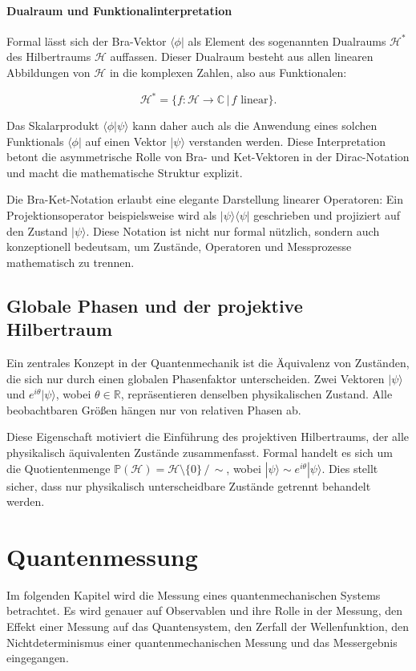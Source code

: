 \paragraph{Dualraum und Funktionalinterpretation}

Formal lässt sich der Bra-Vektor $\langle \phi|$ als Element des sogenannten Dualraums $\mathcal{H}^*$ des Hilbertraums $\mathcal{H}$ auffassen. Dieser Dualraum besteht aus allen linearen Abbildungen von $\mathcal{H}$ in die komplexen Zahlen, also aus Funktionalen:

\[
\mathcal{H}^* = \{ f : \mathcal{H} \to \mathbb{C} \,|\, f \text{ linear} \}.
\]

Das Skalarprodukt $\langle \phi | \psi \rangle$ kann daher auch als die Anwendung eines solchen Funktionals $\langle \phi|$ auf einen Vektor $|\psi\rangle$ verstanden werden. Diese Interpretation betont die asymmetrische Rolle von Bra- und Ket-Vektoren in der Dirac-Notation und macht die mathematische Struktur explizit.

Die Bra-Ket-Notation erlaubt eine elegante Darstellung linearer Operatoren: Ein Projektionsoperator beispielsweise wird als $|\psi\rangle\langle\psi|$ geschrieben und projiziert auf den Zustand $|\psi\rangle$. Diese Notation ist nicht nur formal nützlich, sondern auch konzeptionell bedeutsam, um Zustände, Operatoren und Messprozesse mathematisch zu trennen.

\subsection{Globale Phasen und der projektive Hilbertraum}
\label{subsec:Globale Phasen und der projektive Hilbertraum }

Ein zentrales Konzept in der Quantenmechanik ist die Äquivalenz von Zuständen, die sich nur durch einen globalen Phasenfaktor unterscheiden. Zwei Vektoren $|\psi\rangle$ und $e^{i\theta} |\psi\rangle$, wobei $\theta \in \mathbb{R}$, repräsentieren denselben physikalischen Zustand. Alle beobachtbaren Größen hängen nur von relativen Phasen ab.

Diese Eigenschaft motiviert die Einführung des projektiven Hilbertraums, der alle physikalisch äquivalenten Zustände zusammenfasst. Formal handelt es sich um die Quotientenmenge $\mathbb{P}(\mathcal{H}) = \mathcal{H} \setminus \{0\} \,/\, \sim$, wobei $|\psi\rangle \sim e^{i\theta}|\psi\rangle$. Dies stellt sicher, dass nur physikalisch unterscheidbare Zustände getrennt behandelt werden.


\section{Quantenmessung }
\label{sec: Quantenmessung}
Im folgenden Kapitel wird die Messung eines quantenmechanischen Systems betrachtet. Es wird genauer auf Observablen und ihre Rolle in der Messung, den Effekt einer Messung auf das Quantensystem, den Zerfall der Wellenfunktion, den Nichtdeterminismus einer quantenmechanischen Messung und das Messergebnis eingegangen. 
